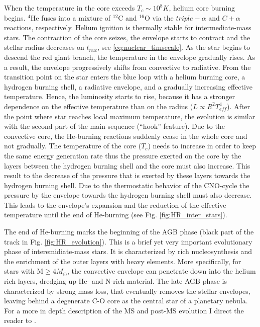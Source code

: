 When the temperature in the core exceeds $T_c \sim 10^8 K$, helium core burning begins. $^4$He fuses into a mixture of $^{12}$C and $^{16
}$O via the $triple- \alpha$ and $C+\alpha$ reactions, respectively. Helium ignition is thermally stable for intermediate-mass stars. The contraction of the core seizes, the envelope starts to contract and the stellar radius decreases on $t_{nuc}$, see \eqref{eq:nuclear_timsecale}. As the star begins to descend the red giant branch, the temperature in the envelope gradually rises. As a result, the envelope progressively shifts from convective to radiative. From the transition point on the star enters the blue loop with a helium burning core, a hydrogen burning shell, a radiative envelope, and a gradually increasing effective temperature.  Hence, the luminosity starts to rise, because it has a stronger dependence on the effective temperature than on the radius ($L \propto R^2 T_{eff}^4$). After the point where star reaches local maximum temperature, the evolution is similar with the second part of the main-sequence (``hook'' feature). Due to the convective core, the He-burning reactions suddenly cease in the whole core and not gradually. The temperature of the core ($T_c$) needs to increase in order to keep the same energy generation rate thus the pressure exerted on the core by the layers between the hydrogen burning shell and the core must also increase. This result to the decrease of the pressure that is exerted by these layers towards the hydrogen burning shell. Due to the thermostatic behavior of the CNO-cycle the pressure by the envelope towards the hydrogen burning shell must also decrease. This leads to the envelope's expansion and the reduction of the effective temperature until the end of He-burning (see Fig. \ref{fig:HR_inter_stars}).

The end of He-burning marks the beginning of the AGB phase (black part of the track in Fig. \ref{fig:HR_evolution}). This is a brief yet very important evolutionary phase of interemidiate-mass stars. It is characterized by rich nucleosynthesis and the enrichment of the outer layers with heavy elements. More specifically, for stars with M$ \geq 4M_{\odot}$, the convective envelope can penetrate down into the helium rich layers, dredging up He- and N-rich material. The late AGB phase is characterized by strong mass loss, that eventually removes the stellar envelopes, leaving behind a degenerate C-O core as the central star of a planetary nebula\citep{pols2011stellar}. For a more in depth description of the MS and post-MS evolution I direct the reader to \cite{pols2011stellar}.


